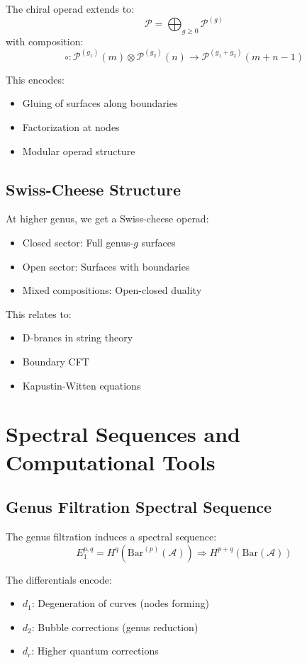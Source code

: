 The chiral operad extends to:
$$\mathcal{P} = \bigoplus_{g \geq 0} \mathcal{P}^{(g)}$$
with composition:
$$\circ: \mathcal{P}^{(g_1)}(m) \otimes \mathcal{P}^{(g_2)}(n) \to \mathcal{P}^{(g_1+g_2)}(m+n-1)$$

This encodes:
\begin{itemize}
\item Gluing of surfaces along boundaries
\item Factorization at nodes
\item Modular operad structure
\end{itemize}

\section{Swiss-Cheese Structure}

At higher genus, we get a Swiss-cheese operad:
\begin{itemize}
\item Closed sector: Full genus-$g$ surfaces
\item Open sector: Surfaces with boundaries
\item Mixed compositions: Open-closed duality
\end{itemize}

This relates to:
\begin{itemize}
\item D-branes in string theory
\item Boundary CFT
\item Kapustin-Witten equations
\end{itemize}

\chapter{Spectral Sequences and Computational Tools}

\section{Genus Filtration Spectral Sequence}

The genus filtration induces a spectral sequence:
$$E_1^{p,q} = H^q(\text{Bar}^{(p)}(\mathcal{A})) \Rightarrow H^{p+q}(\text{Bar}(\mathcal{A}))$$

The differentials encode:
\begin{itemize}
\item $d_1$: Degeneration of curves (nodes forming)
\item $d_2$: Bubble corrections (genus reduction)
\item $d_r$: Higher quantum corrections
\end{itemize}

